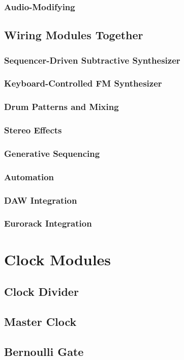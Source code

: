 \documentclass[11pt]{book}
\begin{document}
\subsection{Audio-Modifying}


\section{Wiring Modules Together}
\subsection{Sequencer-Driven Subtractive Synthesizer}
\subsection{Keyboard-Controlled FM Synthesizer}
\subsection{Drum Patterns and Mixing}
\subsection{Stereo Effects}
\subsection{Generative Sequencing}
\subsection{Automation}
\subsection{DAW Integration}
\subsection{Eurorack Integration}


\chapter{Clock Modules}
\section{Clock Divider}
\section{Master Clock}
\section{Bernoulli Gate}
\end{document}
